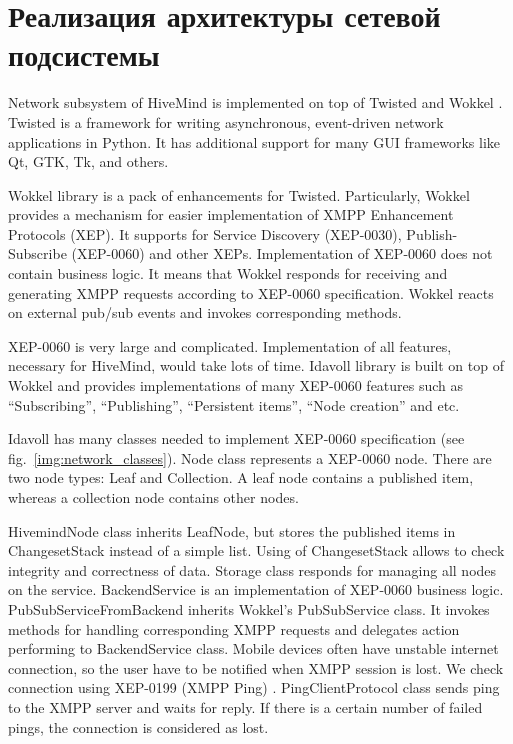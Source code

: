 \section{Реализация архитектуры сетевой подсистемы}

Network subsystem of HiveMind is implemented on top of Twisted \cite{twisted} and
Wokkel \cite{wokkel}. Twisted is a framework for writing asynchronous,
event-driven network applications in Python. It has additional support for many
GUI frameworks like Qt, GTK, Tk, and others.

Wokkel library is a pack of enhancements for Twisted. Particularly, Wokkel
provides a mechanism for easier implementation of XMPP Enhancement Protocols
(XEP). It supports for Service Discovery (XEP-0030), Publish-Subscribe
(XEP-0060) and other XEPs. Implementation of XEP-0060 does not contain business
logic. It means that Wokkel responds for receiving and generating XMPP requests
according to XEP-0060 specification. Wokkel reacts on external pub/sub events
and invokes corresponding methods.

XEP-0060 is very large and complicated. Implementation of all features,
necessary for HiveMind, would take lots of time. Idavoll library is built on top
of Wokkel and provides implementations of many XEP-0060 features such as
``Subscribing'', ``Publishing'', ``Persistent items'', ``Node creation'' and
etc.

Idavoll has many classes needed to implement XEP-0060 specification (see
fig.~\ref{img:network_classes}). Node class represents a XEP-0060 node. There are
two node types: Leaf and Collection. A leaf node contains a published item,
whereas a collection node contains other nodes.


HivemindNode class inherits LeafNode, but stores the published items in
ChangesetStack instead of a simple list. Using of ChangesetStack allows to check
integrity and correctness of data. Storage class responds for managing all nodes
on the service. BackendService is an implementation of XEP-0060 business logic.
PubSubServiceFromBackend inherits Wokkel's PubSubService class. It invokes
methods for handling corresponding XMPP requests and delegates action performing
to BackendService class.
Mobile devices often have unstable internet connection, so the user have to be
notified when XMPP session is lost. We check connection using XEP-0199 (XMPP
Ping) \cite{ping-xep-0199}. PingClientProtocol class sends ping to the XMPP
server and waits for reply. If there is a certain number of failed pings, the
connection is considered as lost.

